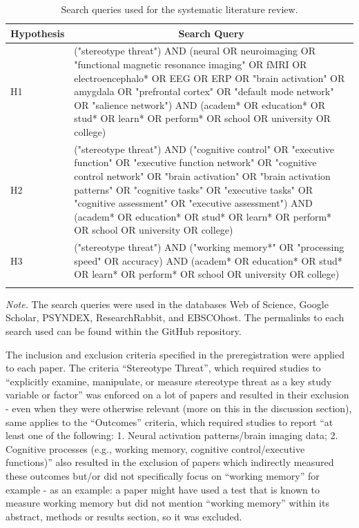 \documentclass[
  stu,floatsintext]{apa7}
\begin{document}
\begin{table}[tbp]

\begin{center}
\begin{threeparttable}

\caption{\label{tab:query_table}Search queries used for the systematic literature review.}

\begin{tabular}{m{4cm}m{12cm}}
\toprule
Hypothesis & \multicolumn{1}{c}{Search Query}\\
\midrule
H1 & ("stereotype threat") AND 
(neural OR neuroimaging OR "functional magnetic resonance imaging" OR fMRI OR electroencephalo* OR EEG OR ERP OR "brain activation" OR amygdala OR "prefrontal cortex" OR "default mode network" OR "salience network") AND
(academ* OR education* OR stud* OR learn* OR perform* OR school OR university OR college)\\
H2 & ("stereotype threat") AND 
("cognitive control" OR "executive function" OR "executive function network" OR "cognitive control network" OR "brain activation" OR "brain activation patterns" OR "cognitive tasks" OR "executive tasks" OR "cognitive assessment" OR "executive assessment") AND 
(academ* OR education* OR stud* OR learn* OR perform* OR school OR university OR college)\\
H3 & ("stereotype threat") AND 
("working memory*" OR "processing speed" OR accuracy) AND 
(academ* OR education* OR stud* OR learn* OR perform* OR school OR university OR college)\\
\bottomrule
\addlinespace
\end{tabular}

\begin{tablenotes}[para]
\normalsize{\textit{Note.} The search queries were used in the databases Web of Science, Google Scholar, PSYNDEX, ResearchRabbit, and EBSCOhost. The permalinks to each search used can be found within the GitHub repository.}
\end{tablenotes}

\end{threeparttable}
\end{center}

\end{table}

The inclusion and exclusion criteria specified in the preregistration were applied to each paper.
The criteria ``Stereotype Threat'', which required studies to ``explicitly examine, manipulate, or measure stereotype threat as a key study variable or factor'' was enforced on a lot of papers and resulted in their exclusion - even when they were otherwise relevant (more on this in the discussion section), same applies to the ``Outcomes'' criteria, which required studies to report ``at least one of the following: 1. Neural activation patterns/brain imaging data; 2. Cognitive processes (e.g., working memory, cognitive control/executive functions)'' also resulted in the exclusion of papers which indirectly measured these outcomes but/or did not specifically focus on ``working memory'' for example - as an example: a paper might have used a test that is known to measure working memory but did not mention ``working memory'' within its abstract, methods or results section, so it was excluded.
\end{document}
